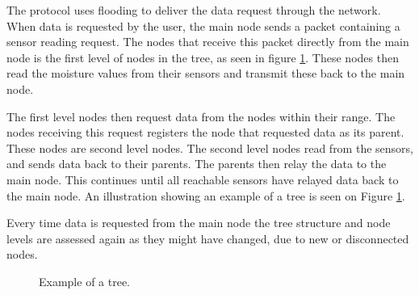 
The protocol uses flooding to deliver the data request through the network. When data is requested by the user, the main node sends a packet containing a sensor reading request. The nodes that receive this packet directly from the main node is the first level of nodes in the tree, as seen in figure \ref{fig:prottree1}. These nodes then read the moisture values from their sensors and transmit these back to the main node. 

The first level nodes then request data from the nodes within their range. The nodes receiving this request registers the node that requested data as its parent. These nodes are second level nodes. The second level nodes read from the sensors, and sends data back to their parents. The parents then relay the data to the main node. This continues until all reachable sensors have relayed data back to the main node.
An illustration showing an example of a tree is seen on Figure \ref{fig:prottree1}.

Every time data is requested from the main node the tree structure and node levels are assessed again as they might have changed, due to new or disconnected nodes.

\begin{figure}[!h]
	\centering
	\caption{Example of a tree.}
	\label{fig:prottree1}
\end{figure}


